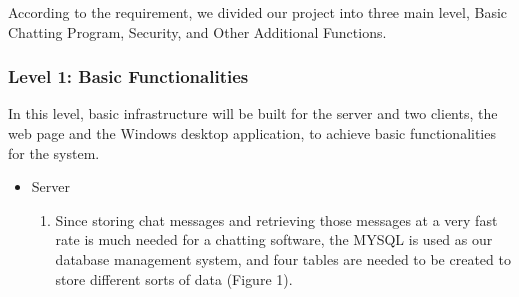 \documentclass[a4paper,11pt]{article}
\begin{document}
According to the requirement, we divided our project into three main level, Basic Chatting Program, Security, and Other Additional Functions. 
\subsubsection{Level 1: Basic Functionalities}
In this level, basic infrastructure will be built for the server and two clients, the web page and the Windows desktop application, to achieve basic functionalities for the system. 

\begin{itemize}




\item Server
\begin{enumerate}
\item  Since storing chat messages and retrieving those messages at a very fast rate is much needed for a chatting software, the MYSQL is used as our database management system, and four tables are needed to be created to store different sorts of data (Figure 1).


\end{enumerate}
\end{itemize}
\end{document}
